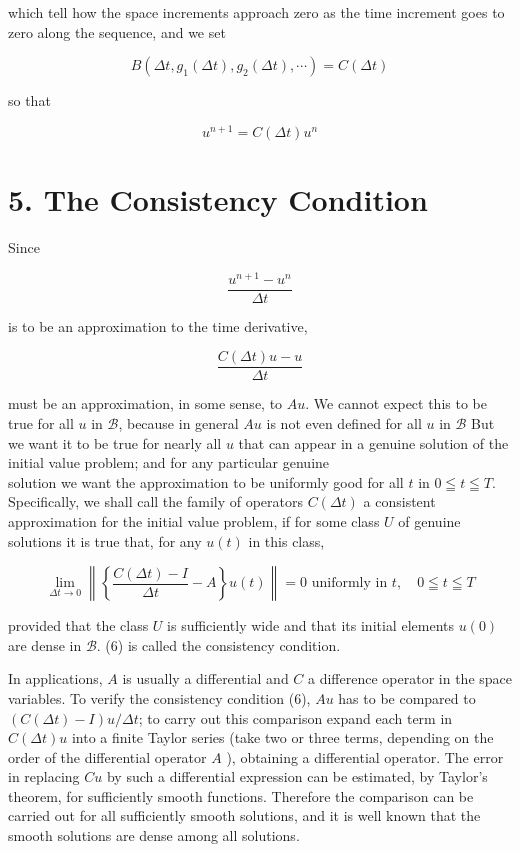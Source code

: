 \documentclass[10pt]{article}
\begin{document}
which tell how the space increments approach zero as the time increment goes to zero along the sequence, and we set

\[
B\left(\Delta t, g_{1}(\Delta t), g_{2}(\Delta t), \cdots\right)=C(\Delta t)
\]

so that

\[
u^{n+1}=C(\Delta t) u^{n}
\]

\section*{5. The Consistency Condition}
Since

\[
\frac{u^{n+1}-u^{n}}{\Delta t}
\]

is to be an approximation to the time derivative,

\[
\frac{C(\Delta t) u-u}{\Delta t}
\]

must be an approximation, in some sense, to \(A u\). We cannot expect this to be true for all \(u\) in \(\mathscr{B}\), because in general \(A u\) is not even defined for all \(u\) in \(\mathscr{B}\) But we want it to be true for nearly all \(u\) that can appear in a genuine solution of the initial value problem; and for any particular genuine\\
solution we want the approximation to be uniformly good for all \(t\) in \(0 \leqq t \leqq T\). Specifically, we shall call the family of operators \(C(\Delta t)\) a consistent approximation for the initial value problem, if for some class \(U\) of genuine solutions it is true that, for any \(u(t)\) in this class,

\[
\lim _{\Delta t \rightarrow 0}\left\|\left\{\frac{C(\Delta t)-I}{\Delta t}-A\right\} u(t)\right\|=0 \text { uniformly in } t, \quad 0 \leqq t \leqq T
\]

provided that the class \(U\) is sufficiently wide and that its initial elements \(u(0)\) are dense in \(\mathscr{B}\). (6) is called the consistency condition.

In applications, \(A\) is usually a differential and \(C\) a difference operator in the space variables. To verify the consistency condition (6), \(A u\) has to be compared to \((C(\Delta t)-I) u / \Delta t\); to carry out this comparison expand each term in \(C(\Delta t) u\) into a finite Taylor series (take two or three terms, depending on the order of the differential operator \(A\) ), obtaining a differential operator. The error in replacing \(C u\) by such a differential expression can be estimated, by Taylor's theorem, for sufficiently smooth functions. Therefore the comparison can be carried out for all sufficiently smooth solutions, and it is well known that the smooth solutions are dense among all solutions.
\end{document}
